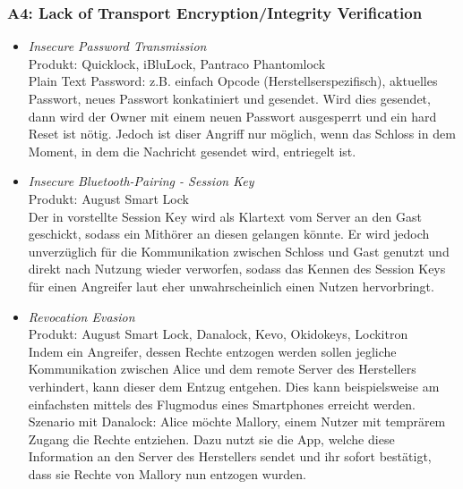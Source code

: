     \subsubsection*{A4: Lack of Transport Encryption/Integrity Verification}
        \begin{itemize}[leftmargin=0cm,label={}]
            \item \emph{Insecure Password Transmission}\cite{Rose2016}\label{vuln:pwdtrns}\\
                Produkt: Quicklock, iBluLock, Pantraco Phantomlock\\
                Plain Text Password: z.B. einfach Opcode (Herstellserspezifisch), aktuelles Passwort, neues Passwort konkatiniert und gesendet. 
    	        Wird dies gesendet, dann wird der Owner mit einem neuen Passwort ausgesperrt und ein hard Reset ist nötig. 
    	        Jedoch ist diser Angriff nur möglich, wenn das Schloss in dem Moment, in dem die Nachricht gesendet wird, entriegelt ist.
            \item \emph{Insecure Bluetooth-Pairing - Session Key}\cite{Fuller2017}\label{vuln:blesk}\\
                Produkt: August Smart Lock\\
                Der in  vorstellte Session Key wird als Klartext vom Server an den Gast geschickt, sodass ein Mithörer an diesen gelangen könnte.
    	        Er wird jedoch unverzüglich für die Kommunikation zwischen Schloss und Gast genutzt und direkt nach Nutzung wieder verworfen, sodass das Kennen des Session Keys für einen Angreifer laut \citeauthor{Fuller2017} eher unwahrscheinlich einen Nutzen hervorbringt.
	        \item \emph{Revocation Evasion}\cite{Fuller2017,Ho2016}\label{vuln:revocationevasion}\\
                Produkt: August Smart Lock, Danalock, Kevo, Okidokeys, Lockitron\\
                Indem ein Angreifer, dessen Rechte entzogen werden sollen jegliche Kommunikation zwischen Alice und dem remote Server des Herstellers verhindert, kann dieser dem Entzug entgehen.
                Dies kann beispielsweise am einfachsten mittels des Flugmodus eines Smartphones erreicht werden.\\
                Szenario mit Danalock: Alice möchte Mallory, einem Nutzer mit temprärem Zugang die Rechte entziehen. 
                Dazu nutzt sie die App, welche diese Information an den Server des Herstellers sendet und ihr sofort bestätigt, dass sie Rechte von Mallory nun entzogen wurden. 

\end{itemize}

